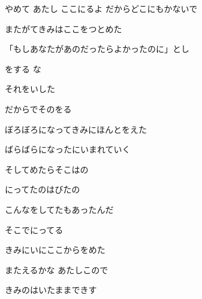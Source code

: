 \documentclass[14pt]{ltjsarticle}
\begin{document}
{  やめて あたし ここにるよ だからどこにもかないで
  \jisho{}

\item
  またがてきみはここをつとめた
  \jisho{}

  「もしあなたがあのだったらよかったのに」とし
  \jisho{}

\item
  をする な
  \jisho{}

  それをいした
  \jisho{}

  だからでそのをる
  \jisho{}

\item
  ぼろぼろになってきみにほんとをえた
  \jisho{}

  ばらばらになったにいまれていく
  \jisho{}

  そしてめたらそこはの
  \jisho{}

\item
  にってたのはびたの
  \jisho{}

  こんなをしてたもあったんだ
  \jisho{}

  そこでにってる
  \jisho{}

  きみにいにここからをめた
  \jisho{}

\item
  またえるかな あたしこので
  \jisho{}

  きみのはいたままできす
  \jisho{}

  
}
\end{document}
